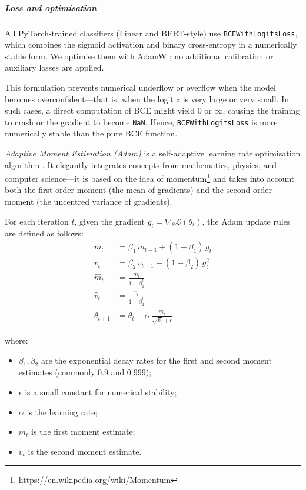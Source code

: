 \documentclass[12pt]{article}
\begin{document}
\subparagraph{Loss and optimisation}

All PyTorch-trained classifiers (Linear and BERT-style) use \texttt{BCEWithLogitsLoss}, which combines the sigmoid activation and binary cross-entropy in a numerically stable form. 
We optimise them with AdamW \cite{paszke2019pytorch,loshchilov2019adamw}; no additional calibration or auxiliary losses are applied.

This formulation prevents numerical underflow or overflow when the model becomes overconfident\;---\;that is, when the logit $z$ is very large or very small. In such cases, a direct computation of BCE might yield $0$ or $\infty$, causing the training to crash or the gradient to become \texttt{NaN}. Hence, \texttt{BCEWithLogitsLoss} is more numerically stable than the pure BCE function.

\textit{Adaptive Moment Estimation (Adam)} is a self-adaptive learning rate optimisation algorithm \cite{kingma2014adam}. It elegantly integrates concepts from mathematics, physics, and computer science\;---\;it is based on the idea of momentum\footnote{\url{https://en.wikipedia.org/wiki/Momentum}} and takes into account both the first-order moment (the mean of gradients) and the second-order moment (the uncentred variance of gradients).

For each iteration $t$, given the gradient $g_t = \nabla_\theta \mathcal{L}(\theta_t)$,  
the Adam update rules are defined as follows:
\begin{equation}
\begin{aligned}
m_t &= \beta_1 \, m_{t-1} + (1 - \beta_1) \, g_t \\
v_t &= \beta_2 \, v_{t-1} + (1 - \beta_2) \, g_t^2 \\
\hat{m}_t &= \frac{m_t}{1 - \beta_1^t} \\
\hat{v}_t &= \frac{v_t}{1 - \beta_2^t} \\
\theta_{t+1} &= \theta_t - \alpha \, \frac{\hat{m}_t}{\sqrt{\hat{v}_t} + \epsilon}
\end{aligned}
\end{equation}

where:
\begin{itemize}
    \item $\beta_1, \beta_2$ are the exponential decay rates for the first and second moment estimates (commonly 0.9 and 0.999);
    \item $\epsilon$ is a small constant for numerical stability;
    \item $\alpha$ is the learning rate;
    \item $m_t$ is the first moment estimate;
    \item $v_t$ is the second moment estimate.
\end{itemize}
\end{document}
